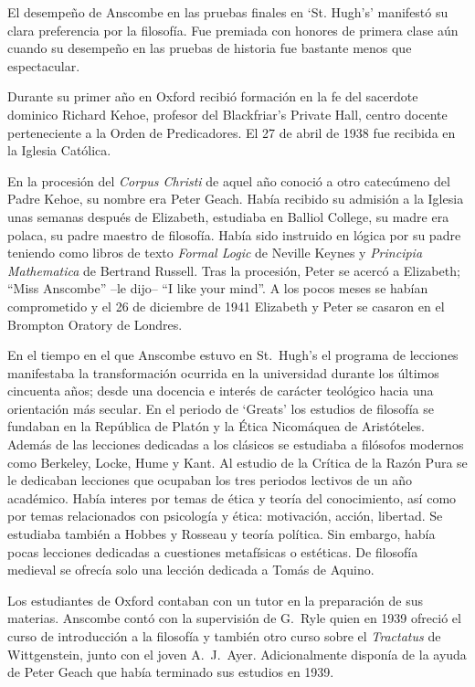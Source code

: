 El desempeño de Anscombe en las pruebas finales en `St. Hugh's' manifestó su clara preferencia por la filosofía. Fue premiada con honores de primera clase aún cuando su desempeño en las pruebas de historia fue bastante menos que espectacular.\autocite[Cf.~][3]{teichmann2008ans}

Durante su primer año en Oxford recibió formación en la fe del sacerdote dominico Richard Kehoe, profesor del Blackfriar's Private Hall, centro docente perteneciente a la Orden de Predicadores. El 27 de abril de 1938 fue recibida en la Iglesia Católica.

En la procesión del \emph{Corpus Christi} de aquel año conoció a otro catecúmeno del Padre Kehoe, su nombre era Peter Geach. Había recibido su admisión a la Iglesia unas semanas después de Elizabeth, estudiaba en Balliol College, su madre era polaca, su padre maestro de filosofía. Había sido instruido en lógica por su padre teniendo como libros de texto \emph{Formal Logic} de Neville Keynes y \emph{Principia Mathematica} de Bertrand Russell. Tras la procesión, Peter se acercó a Elizabeth; \enquote{Miss Anscombe} --le dijo-- \enquote{I like your mind}.\autocite[Cf.~][187]{kenny2016fellows} A los pocos meses se habían comprometido y el 26 de diciembre de 1941 Elizabeth y Peter se casaron en el Brompton Oratory de Londres.\autocite[Cf.~][33]{teichman2002fellows}

En el tiempo en el que Anscombe estuvo en St.~Hugh's el programa de lecciones manifestaba la transformación ocurrida en la universidad durante los últimos cincuenta años; desde una docencia e interés de carácter teológico hacia una orientación más secular. En el periodo de `Greats' los estudios de filosofía se fundaban en la República de Platón y la Ética Nicomáquea de Aristóteles. Además de las lecciones dedicadas a los clásicos se estudiaba a filósofos modernos como Berkeley, Locke, Hume y Kant. Al estudio de la Crítica de la Razón Pura se le dedicaban lecciones que ocupaban los tres periodos lectivos de un año académico. Había interes por temas de ética y teoría del conocimiento, así como por temas relacionados con psicología y ética: motivación, acción, libertad. Se estudiaba también a Hobbes y Rosseau y teoría política. Sin embargo, había pocas lecciones dedicadas a cuestiones metafísicas o estéticas. De filosofía medieval se ofrecía solo una lección dedicada a Tomás de Aquino.\autocite[Cf.~][23--24]{torralba2005accion}

Los estudiantes de Oxford contaban con un tutor en la preparación de sus materias. Anscombe contó con la supervisión de G.~Ryle quien en 1939 ofreció el curso de introducción a la filosofía y también otro curso sobre el \emph{Tractatus} de Wittgenstein, junto con el joven A.~J.~Ayer. Adicionalmente disponía de la ayuda de Peter Geach que había terminado sus estudios en 1939.\autocite[Cf.~][24]{torralba2005accion}

